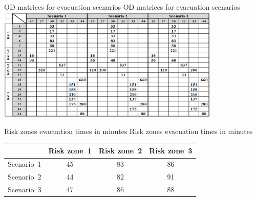 \createfigure%
{OD matrices for evacuation scenarios}%
{OD matrices for evacuation scenarios}%
{\label{fig:aliaga_tab1}}%
{\includegraphics[width=0.8\textwidth, angle=0]{scenarios/figures/aliaga_tab1.png}}%
{}

\createtable%
{Risk zones evacuation times in minutes}%
{Risk zones evacuation times in minutes}%
{\label{tab:aliaga_tab2}}%
{%
  \begin{tabular}[c]{|l|c|c|c|}
    \hline
		& \textbf{Risk zone~1} & \textbf{Risk zone~2} & \textbf{Risk zone~3} \\
		\hline
    Scenario~1 & 45 & 83 & 86 \\
		Scenario~2 & 44 & 82 & 91 \\
		Scenario~3 & 47 & 86 & 88 \\
    \hline
  \end{tabular}
}%
{}

